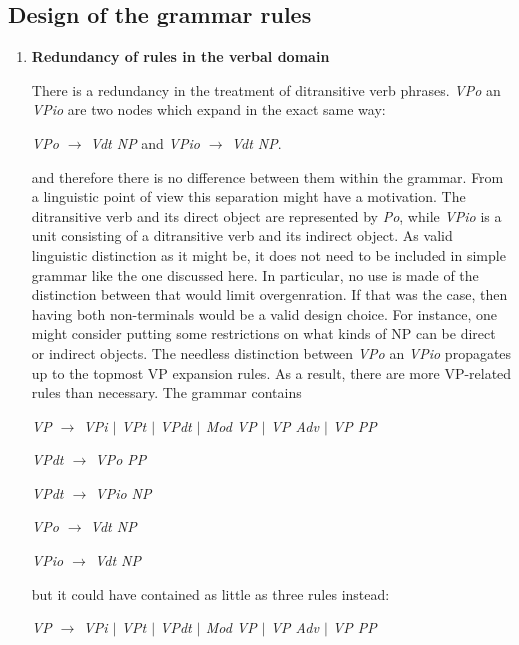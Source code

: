 \documentclass{article}
\begin{document}
	\subsection{Design of the grammar rules}
	\begin{enumerate}
		\item
		\textbf{Redundancy of rules in the verbal domain}
		
		There is a redundancy in the treatment of ditransitive verb phrases. \emph{VPo} an \emph{VPio} are two nodes which expand in the exact same way:
		\begin{center}
			
			\emph{VPo $\rightarrow$ Vdt NP} and \emph{VPio $\rightarrow$ Vdt NP}.
			
		\end{center}
		and therefore there is no difference between them within the grammar. From a linguistic point of view this separation might have a motivation. The ditransitive verb and its direct object are represented by \emph{Po}, while \emph{VPio} is a unit consisting of a ditransitive verb and its indirect object. As valid linguistic distinction as it might be, it does not need to be included in simple grammar like the one discussed here. In particular, no use is made of the distinction between that would limit overgenration. If that was the case, then having both non-terminals would be a valid design choice. For instance, one might consider putting some restrictions on what kinds of NP can be direct or indirect objects.
		The needless distinction between \emph{VPo} an \emph{VPio} propagates up to the topmost VP expansion rules. As a result, there are more VP-related rules than necessary. The grammar contains
		\begin{center}
			
			\emph{VP $\rightarrow$ VPi $\vert$ VPt $\vert$ VPdt $\vert$ Mod VP $\vert$ VP Adv $\vert$ VP PP}
			
			\emph{VPdt $\rightarrow$ VPo PP}
			
			\emph{VPdt $\rightarrow$ VPio NP}
			
			\emph{VPo $\rightarrow$ Vdt NP}
			
			\emph{VPio $\rightarrow$ Vdt NP}
			
		\end{center}
		but it could have contained as little as three rules instead:
		
		\begin{center}
			
			\emph{VP $\rightarrow$ VPi $\vert$ VPt $\vert$ VPdt $\vert$ Mod VP $\vert$ VP Adv $\vert$ VP PP}
			

\end{center}
\end{enumerate}
\end{document}
